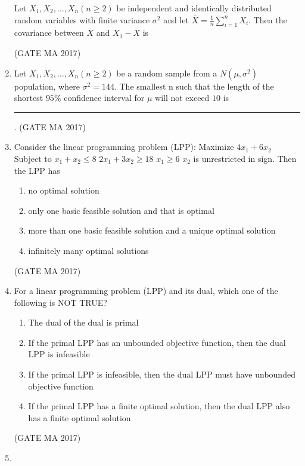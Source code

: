 \documentclass[journal,12pt,onecolumn]{IEEEtran}
\theoremstyle{remark}
\begin{document}
\begin{enumerate}
Let $X_1, X_2, \dots, X_n (n \ge 2)$ be independent and identically distributed random variables with finite variance $\sigma^2$ and let $\bar{X} = \frac{1}{n} \sum_{i=1}^n X_i$. Then the covariance between $\bar{X}$ and $X_1 - \bar{X}$ is
\begin{enumerate}
\end{enumerate}
\hfill (GATE MA 2017)
\item
Let $X_1, X_2, \dots, X_n (n \ge 2)$ be a random sample from a $N(\mu, \sigma^2)$ population, where $\sigma^2 = 144$. The smallest n such that the length of the shortest $95\%$ confidence interval for $\mu$ will not exceed $10$ is \rule{1.5cm}{0.4pt}.
\hfill (GATE MA 2017)
\item
Consider the linear programming problem (LPP):
Maximize $4x_1 + 6x_2$
Subject to
$x_1 + x_2 \le 8$
$2x_1 + 3x_2 \ge 18$
$x_1 \ge 6$
$x_2$ is unrestricted in sign.
Then the LPP has
\begin{enumerate}
\item no optimal solution
\item only one basic feasible solution and that is optimal
\item more than one basic feasible solution and a unique optimal solution
\item infinitely many optimal solutions
\end{enumerate}
\hfill (GATE MA 2017)
\item
For a linear programming problem (LPP) and its dual, which one of the following is NOT TRUE?
\begin{enumerate}
\item The dual of the dual is primal
\item If the primal LPP has an unbounded objective function, then the dual LPP is infeasible
\item If the primal LPP is infeasible, then the dual LPP must have unbounded objective function
\item If the primal LPP has a finite optimal solution, then the dual LPP also has a finite optimal solution
\end{enumerate}
\hfill (GATE MA 2017)
\item

\end{enumerate}
\end{document}
